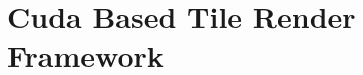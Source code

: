 \documentclass{si_template/cn_note}
\begin{document}
\frontmatter
\mainmatter

\chapter{Cuda Based Tile Render Framework}


\backmatter
\end{document}
